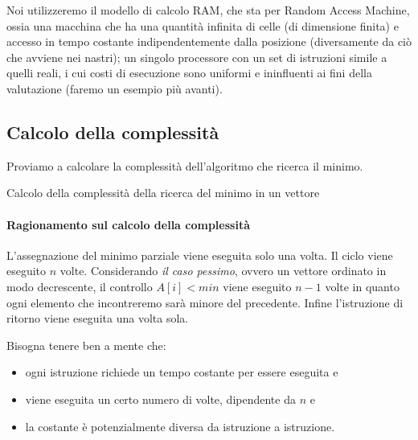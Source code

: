 Noi utilizzeremo il modello di calcolo RAM, che sta per Random Access Machine, ossia una macchina che ha una quantità infinita di celle (di dimensione finita) e accesso in tempo costante indipendentemente dalla posizione (diversamente da ciò che avviene nei nastri); un singolo processore con un set di istruzioni simile a quelli reali, i cui costi di esecuzione sono uniformi e ininfluenti ai fini della valutazione (faremo un esempio più avanti).

\subsection{Calcolo della complessità}

Proviamo a calcolare la complessità dell'algoritmo che ricerca il minimo.

\begin{algorithm}[H]
\caption{Calcolo della complessità della ricerca del minimo in un vettore}

\BlankLine
\end{algorithm}

\paragraph{Ragionamento sul calcolo della complessità}
L'assegnazione del minimo parziale viene eseguita solo una volta.
Il ciclo viene eseguito \(n\) volte.
Considerando \emph{il caso pessimo}, ovvero un vettore ordinato in modo decrescente, il controllo \(A[i] < min\) viene eseguito \(n-1\) volte in quanto ogni elemento che incontreremo sarà minore del precedente.
Infine l'istruzione di ritorno viene eseguita una volta sola.

Bisogna tenere ben a mente che:
\begin{itemize}
	\item ogni istruzione richiede un tempo costante per essere eseguita e
	\item viene eseguita un certo numero di volte, dipendente da \(n\) e
	\item la costante è potenzialmente diversa da istruzione a istruzione.
\end{itemize}

